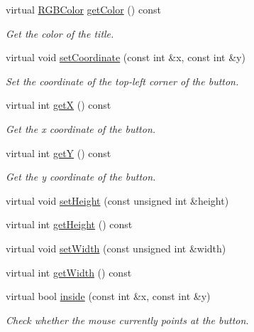 \begin{DoxyCompactItemize}
virtual \mbox{\hyperlink{class_r_g_b_color}{R\+G\+B\+Color}} \mbox{\hyperlink{class_button_a3388931e8e8cef41336f973578304c8a}{get\+Color}} () const
\begin{DoxyCompactList}\small\item\em Get the color of the title. \end{DoxyCompactList}\item 
virtual void \mbox{\hyperlink{class_button_a808e7d56490172fdeab84afb01fc4bde}{set\+Coordinate}} (const int \&x, const int \&y)
\begin{DoxyCompactList}\small\item\em Set the coordinate of the top-\/left corner of the button. \end{DoxyCompactList}\item 
virtual int \mbox{\hyperlink{class_button_a05c6aae1cf037ad66e3821963fe72988}{getX}} () const
\begin{DoxyCompactList}\small\item\em Get the x coordinate of the button. \end{DoxyCompactList}\item 
virtual int \mbox{\hyperlink{class_button_a3acf216100c43b999e38047bfdf99ee7}{getY}} () const
\begin{DoxyCompactList}\small\item\em Get the y coordinate of the button. \end{DoxyCompactList}\item 
virtual void \mbox{\hyperlink{class_button_a6b048681f073eae03631251ddee96b17}{set\+Height}} (const unsigned int \&height)
\item 
virtual int \mbox{\hyperlink{class_button_ab4e3a35e683df269eb4b178632694dbf}{get\+Height}} () const
\item 
virtual void \mbox{\hyperlink{class_button_a77d90f51ba19a275e9d662cbb081049f}{set\+Width}} (const unsigned int \&width)
\item 
virtual int \mbox{\hyperlink{class_button_a75acf94e1d23db5a64830c8ea7280c0a}{get\+Width}} () const
\item 
virtual bool \mbox{\hyperlink{class_button_ac2449ee251bb58bb505b3b6c825d4129}{inside}} (const int \&x, const int \&y)
\begin{DoxyCompactList}\small\item\em Check whether the mouse currently points at the button. \end{DoxyCompactList}\end{DoxyCompactItemize}


